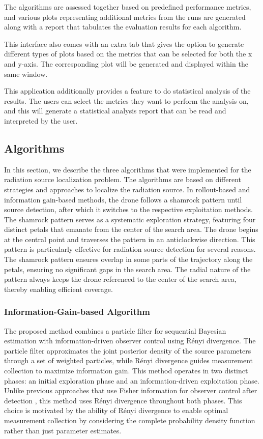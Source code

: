 \documentclass[../report.tex]{subfiles}
\begin{document}
    The algorithms are assessed together based on predefined performance metrics, and various plots representing additional metrics from the runs are generated along with a report that tabulates 
    the evaluation results for each algorithm. 

    This interface also comes with an extra tab that gives the option to generate different types of plots based on the metrics that can be selected for both the x and y-axis. The corresponding 
    plot will be generated and displayed within the same window.

    This application additionally provides a feature to do statistical analysis of the results. The users can select the metrics they want to perform the analysis on, and this will generate a 
    statistical analysis report that can be read and interpreted by the user.

    \subsection{Algorithms}

    In this section, we describe the three algorithms that were implemented for the radiation source localization problem. The algorithms are based on different strategies and approaches to
    localize the radiation source. In rollout-based and information gain-based methods, the drone follows a shamrock pattern until source detection, after which it switches to the 
    respective exploitation methods. The shamrock pattern serves as a systematic exploration strategy, featuring four distinct petals that emanate from the center of the search area. 
    The drone begins at the central point and traverses the pattern in an anticlockwise direction. This pattern is particularly effective for radiation source detection for several reasons.
    The shamrock pattern ensures overlap in some parts of the trajectory along the petals, ensuring no significant gaps in the search area. The radial nature of the pattern always 
    keeps the drone referenced to the center of the search area, thereby enabling efficient coverage.

    \subsubsection{Information-Gain-based Algorithm}

    The proposed method combines a particle filter for sequential Bayesian estimation with information-driven observer control using Rényi divergence. The particle filter approximates
    the joint posterior density of the source parameters through a set of weighted particles, while Rényi divergence guides measurement collection to maximize information gain. 
    This method operates in two distinct phases: an initial exploration phase and an information-driven exploitation phase. Unlike previous approaches that use Fisher information for observer control
    after detection \cite{Ristic2007AnIG}, this method uses Rényi divergence throughout both phases. This choice is motivated by the ability of Rényi divergence to enable optimal measurement collection 
    by considering the complete probability density function rather than just parameter estimates.
\end{document}
